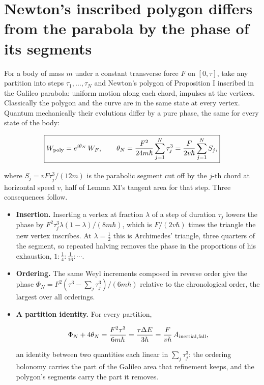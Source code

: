 \documentclass[11pt,a4paper]{article}
\begin{document}
\hypertarget{newtons-inscribed-polygon-differs-from-the-parabola-by-the-phase-of-its-segments}{%
\section{Newton's inscribed polygon differs from the parabola by the
phase of its
segments}\label{newtons-inscribed-polygon-differs-from-the-parabola-by-the-phase-of-its-segments}}

For a body of mass \(m\) under a constant transverse force \(F\) on
\([0,\tau]\), take any partition into steps \(\tau_1,\dots,\tau_N\) and
Newton's polygon of Proposition I inscribed in the Galileo parabola:
uniform motion along each chord, impulses at the vertices. Classically
the polygon and the curve are in the same state at every vertex. Quantum
mechanically their evolutions differ by a pure phase, the same for every
state of the body:

\[\boxed{W_{\rm poly}=e^{i\theta_N}\,W_F,\qquad
\theta_N=\frac{F^2}{24m\hbar}\sum_{j=1}^N\tau_j^3
=\frac{F}{2v\hbar}\sum_{j=1}^NS_j ,}\]

where \(S_j=vF\tau_j^3/(12m)\) is the parabolic segment cut off by the
\(j\)-th chord at horizontal speed \(v\), half of Lemma XI's tangent
area for that step. Three consequences follow.

\begin{itemize}
\item
  \textbf{Insertion.} Inserting a vertex at fraction \(\lambda\) of a
  step of duration \(\tau_j\) lowers the phase by
  \(F^2\tau_j^3\lambda(1-\lambda)/(8m\hbar)\), which is \(F/(2v\hbar)\)
  times the triangle the new vertex inscribes. At \(\lambda=\frac12\)
  this is Archimedes' triangle, three quarters of the segment, so
  repeated halving removes the phase in the proportions of his
  exhaustion, \(1:\frac14:\frac1{16}:\cdots\).
\item
  \textbf{Ordering.} The same Weyl increments composed in reverse order
  give the phase \(\Phi_N=F^2(\tau^3-\sum_j\tau_j^3)/(6m\hbar)\)
  relative to the chronological order, the largest over all orderings.
\item
  \textbf{A partition identity.} For every partition,

  \[\Phi_N+4\theta_N=\frac{F^2\tau^3}{6m\hbar}=\frac{\tau\Delta E}{3\hbar}
  =\frac{F}{v\hbar}\,A_{\rm inertial,fall},\]

  an identity between two quantities each linear in \(\sum_j\tau_j^3\):
  the ordering holonomy carries the part of the Galileo area that
  refinement keeps, and the polygon's segments carry the part it
  removes.
\end{itemize}
\end{document}
